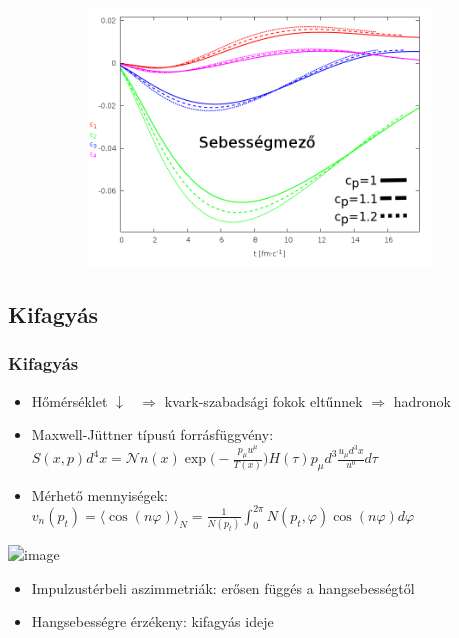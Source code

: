 \documentclass{beamer}
\begin{document}
\begin{frame}
\begin{center}
\begin{figure}[H]
\begin{subfigure}[b]{0.49\textwidth}
        	\includegraphics[width=\textwidth]{pic/res/rel/eps_pc_v}
	\end{subfigure}
\end{figure}
\end{center}
\end{frame}

\subsection{Kifagyás}
\begin{frame}
\frametitle{Kifagyás}
\begin{itemize}
\item<1-> Hőmérséklet $\downarrow\;\;\;\Rightarrow$ kvark-szabadsági fokok eltűnnek $\Rightarrow$ hadronok
\item<1-> Maxwell-Jüttner típusú forrásfüggvény: 
$S(x, p)d^4x=\mathcal{N}n(x)\exp{\bigg(-\frac{p_\mu u^\mu}{T(x)}\bigg)}H(\tau)p_\mu d^3\frac{u_\mu d^3x}{u^0} d\tau$
\item<1-> Mérhető mennyiségek:
$v_n(p_t)=\langle\cos(n\varphi)\rangle_{N}=\frac{1}{N(p_t)}\int_0^{2\pi} N(p_t, \varphi)\cos(n\varphi)d\varphi$
\end{itemize}
\begin{minipage}{0.49\textwidth}
\begin{center}
\includegraphics<1->[scale=0.23]{pic/res/rel/vn_kappa}
\end{center}
\end{minipage}
\begin{minipage}{0.5\textwidth}
\begin{itemize}
\item<1-> Impulzustérbeli aszimmetriák: erősen függés a hangsebességtől
\item<1-> Hangsebességre érzékeny: kifagyás ideje
\end{itemize}
\end{minipage}
\end{frame}
\end{document}
